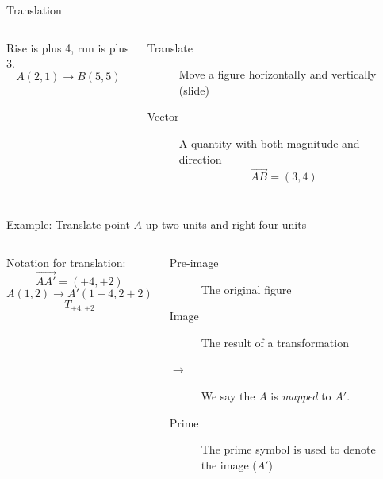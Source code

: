 \documentclass[onlytextwidth, aspectratio=169]{beamer}
\begin{document}
\begin{frame}{Translation}
    \begin{columns}
      Rise is plus 4, run is plus 3. \\
      $$A(2,1) \rightarrow B(5,5)$$
      \begin{description}
        \item[Translate] Move a figure horizontally and vertically (slide)
        \item[Vector] A quantity with both magnitude and direction 
        $$\overrightarrow{AB}=(3,4)$$
      \end{description}
      \begin{flushright}
      \end{flushright}
    \end{columns}
  \end{frame}

\begin{frame}{Example: Translate point $A$ up two units and right four units}
    \begin{columns}
        Notation for translation: \\
        $$\overrightarrow{AA'}=(+4,+2)$$
        $$A(1,2) \rightarrow A'(1+4,2+2)$$
        $$T_{+4,+2}$$
        \begin{description}
            \item[Pre-image] The original figure
            \item[Image] The result of a transformation
            \item[$\rightarrow$] We say the $A$ is \emph{mapped} to $A'$.
            \item[Prime] The prime symbol is used to denote the image ($A'$)
          \end{description}
    \begin{flushright}
    \end{flushright}
\end{columns}
\end{frame}
\end{document}
